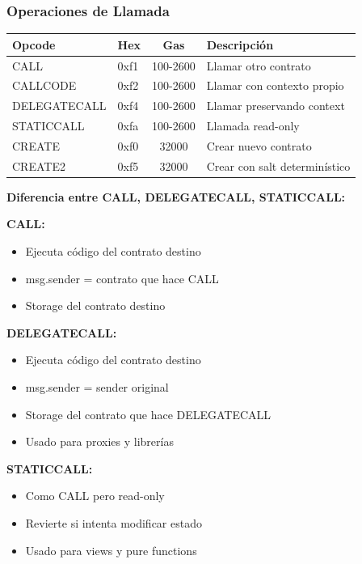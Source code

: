 \documentclass[11pt,a4paper,twoside,openright]{book}
\theoremstyle{definition}
\theoremstyle{plain}
\theoremstyle{remark}
\begin{document}
\subsubsection{Operaciones de Llamada}

\begin{center}
\begin{tabular}{llcl}
\toprule
\textbf{Opcode} & \textbf{Hex} & \textbf{Gas} & \textbf{Descripción} \\
\midrule
CALL & 0xf1 & 100-2600 & Llamar otro contrato \\
CALLCODE & 0xf2 & 100-2600 & Llamar con contexto propio \\
DELEGATECALL & 0xf4 & 100-2600 & Llamar preservando context \\
STATICCALL & 0xfa & 100-2600 & Llamada read-only \\
CREATE & 0xf0 & 32000 & Crear nuevo contrato \\
CREATE2 & 0xf5 & 32000 & Crear con salt determinístico \\
\bottomrule
\end{tabular}
\end{center}

\begin{mathnote}
\textbf{Diferencia entre CALL, DELEGATECALL, STATICCALL:}

\textbf{CALL:}
\begin{itemize}
    \item Ejecuta código del contrato destino
    \item msg.sender = contrato que hace CALL
    \item Storage del contrato destino
\end{itemize}

\textbf{DELEGATECALL:}
\begin{itemize}
    \item Ejecuta código del contrato destino
    \item msg.sender = sender original
    \item Storage del contrato que hace DELEGATECALL
    \item Usado para proxies y librerías
\end{itemize}

\textbf{STATICCALL:}
\begin{itemize}
    \item Como CALL pero read-only
    \item Revierte si intenta modificar estado
    \item Usado para views y pure functions
\end{itemize}
\end{mathnote}
\end{document}
